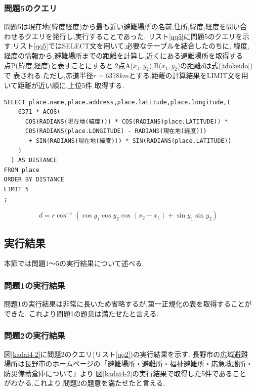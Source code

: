\documentclass[a4j]{jarticle}
\begin{document}
    \subsubsection{問題5のクエリ}
    問題5は現在地(緯度経度)から最も近い避難場所の名前,住所,緯度,経度を問い合わせるクエリを発行し,実行することであった.
    リスト\ref{qq5}に問題5のクエリを示す.リスト\ref{qq5}ではSELECT文を用いて,必要なテーブルを結合したのちに,
    緯度,経度の情報から,避難場所までの距離を計算し,近くにある避難場所を取得する.
    点P(緯度,経度)と表すことにすると,2点A($x_1,y_2$),B($x_1,y_2$)の距離$d$は式(\ref{idokeido})で
    表される\cite{idokeido}.ただし,赤道半径$r = 6378 km$とする.距離の計算結果をLIMIT文を用いて距離が近い順に,上位5件
    取得する.
    \begin{lstlisting}[basicstyle=\ttfamily\footnotesize, frame=single,label=qq5,caption=問題5のクエリ]
SELECT place.name,place.address,place.latitude,place.longitude,( 
    6371 * ACOS( 
      COS(RADIANS(現在地(緯度))) * COS(RADIANS(place.LATITUDE)) * 
      COS(RADIANS(place.LONGITUDE) - RADIANS(現在地(経度)))
       + SIN(RADIANS(現在地(緯度))) * SIN(RADIANS(place.LATITUDE))
    )
  ) AS DISTANCE 
FROM place
ORDER BY DISTANCE 
LIMIT 5
;
      \end{lstlisting}

      \begin{equation}
        d = r \cos^{-1}\left( \cos y_1 \cos y_2 \cos(x_2 - x_1) + \sin y_1 \sin y_2  \right)
        \label{idokeido}
      \end{equation}
    \subsection{実行結果}
    本節では問題1～5の実行結果について述べる.
    \subsubsection{問題1の実行結果}
    問題1の実行結果は非常に長いため省略するが,第一正規化の表を取得することができた.
    これより問題1の題意は満たせたと言える.
    \subsubsection{問題2の実行結果}
    図\ref{kadai4-2}に問題2のクエリ(リスト\ref{qq2})の実行結果を示す.
    長野市の広域避難場所は長野市のホームページの「避難場所・避難所・福祉避難所・応急救護所・防災備蓄倉庫について」\cite{hinan}より
    図\ref{kadai4-2}の実行結果で取得した5件であることがわかる.これより,問題2の題意を満たせたと言える.
\end{document}
